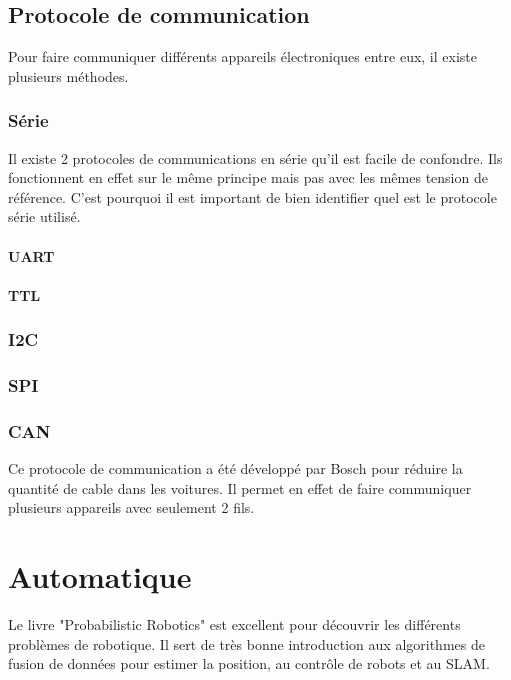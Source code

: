 \documentclass[a4paper, 11pt]{report}
\begin{document}
\chapter{Protocole de communication}

Pour faire communiquer différents appareils électroniques entre eux, il existe plusieurs méthodes.

\section{Série}
Il existe 2 protocoles de communications en série qu'il est facile de confondre. Ils fonctionnent en effet sur le même principe mais pas avec les mêmes tension de référence. C'est pourquoi il est important de bien identifier quel est le protocole série utilisé.

\subsection{UART}

\subsection{TTL}

\section{I2C}

\section{SPI}

\section{CAN}
Ce protocole de communication a été développé par Bosch pour réduire la quantité de cable dans les voitures. Il permet en effet de faire communiquer plusieurs appareils avec seulement 2 fils.

\part{Automatique}

Le livre "Probabilistic Robotics" est excellent pour découvrir les différents problèmes de robotique. Il sert de très bonne introduction aux algorithmes de fusion de données pour estimer la position, au contrôle de robots et au SLAM.
\end{document}
